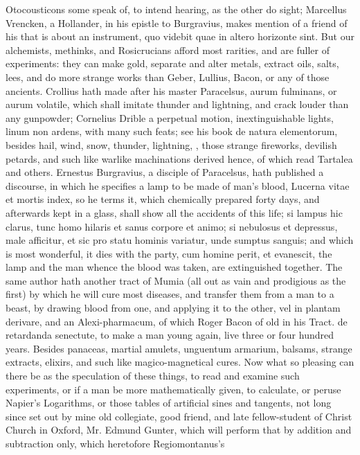 {Otocousticons some speak of, to intend hearing, as the other do sight;
Marcellus Vrencken, a Hollander, in his epistle to Burgravius, makes
mention of a friend of his that is about an instrument, quo videbit
quae in altero horizonte sint. But our alchemists, methinks, and
Rosicrucians afford most rarities, and are fuller of experiments: they
can make gold, separate and alter metals, extract oils, salts, lees,
and do more strange works than Geber, Lullius, Bacon, or any of those
ancients. Crollius hath made after his master Paracelsus, aurum
fulminans, or aurum volatile, which shall imitate thunder and
lightning, and crack louder than any gunpowder; Cornelius Drible a
perpetual motion, inextinguishable lights, linum non ardens, with many
such feats; see his book de natura elementorum, besides hail, wind,
snow, thunder, lightning, \etc{}, those strange fireworks, devilish
petards, and such like warlike machinations derived hence, of which
read Tartalea and others. Ernestus Burgravius, a disciple of
Paracelsus, hath published a discourse, in which he specifies a lamp to
be made of man's blood, Lucerna vitae et mortis index, so he terms it,
which chemically prepared forty days, and afterwards kept in a glass,
shall show all the accidents of this life; si lampus hic clarus, tunc
homo hilaris et sanus corpore et animo; si nebulosus et depressus, male
afficitur, et sic pro statu hominis variatur, unde sumptus sanguis;
and which is most wonderful, it dies with the party, cum homine
perit, et evanescit, the lamp and the man whence the blood was taken,
are extinguished together. The same author hath another tract of Mumia
(all out as vain and prodigious as the first) by which he will cure
most diseases, and transfer them from a man to a beast, by drawing
blood from one, and applying it to the other, vel in plantam derivare,
and an Alexi-pharmacum, of which Roger Bacon of old in his Tract. de
retardanda senectute, to make a man young again, live three or four
hundred years. Besides panaceas, martial amulets, unguentum armarium,
balsams, strange extracts, elixirs, and such like magico-magnetical
cures. Now what so pleasing can there be as the speculation of these
things, to read and examine such experiments, or if a man be more
mathematically given, to calculate, or peruse Napier's Logarithms, or
those tables of artificial sines and tangents, not long since set
out by mine old collegiate, good friend, and late fellow-student of
Christ Church in Oxford, Mr. Edmund Gunter, which will perform
that by addition and subtraction only, which heretofore Regiomontanus's
}
